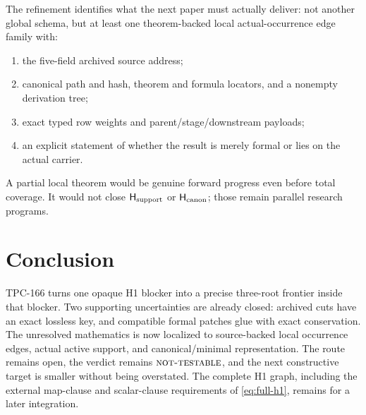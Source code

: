 \documentclass[11pt]{article}
\theoremstyle{definition}
\theoremstyle{remark}
\newcommand{\NT}{\textnormal{\textsc{not-testable}}}
\newcommand{\Hsupport}{\mathsf H_{\rm support}}
\newcommand{\Hcanon}{\mathsf H_{\rm canon}}
\begin{document}
The refinement identifies what the next paper must actually deliver:
not another global schema, but at least one theorem-backed local
actual-occurrence edge family with:
\begin{enumerate}[leftmargin=2.1em]
 \item the five-field archived source address;
 \item canonical path and hash, theorem and formula locators, and a
       nonempty derivation tree;
 \item exact typed row weights and parent/stage/downstream payloads;
 \item an explicit statement of whether the result is merely formal
       or lies on the actual carrier.
\end{enumerate}
A partial local theorem would be genuine forward progress even before
total coverage.  It would not close \(\Hsupport\) or \(\Hcanon\);
those remain parallel research programs.

\section{Conclusion}

TPC-166 turns one opaque H1 blocker into a precise three-root frontier
inside that blocker.  Two supporting uncertainties are already closed:
archived
cuts have an exact lossless key, and compatible formal patches glue
with exact conservation.  The unresolved mathematics is now
localized to source-backed local occurrence edges, actual active
support, and canonical/minimal representation.  The route remains
open, the verdict remains \(\NT\), and the next constructive target
is smaller without being overstated.  The complete H1 graph,
including the external map-clause and scalar-clause requirements of
\eqref{eq:full-h1}, remains for a later integration.


{\small}
\end{document}
